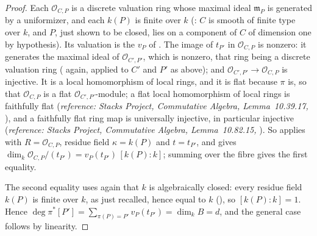 \begin{proof}
Each \(\mathcal O_{C,P}\) is a discrete valuation ring whose maximal
ideal \(\mathfrak m_P\) is generated by a uniformizer, and each
\(k(P)\) is finite over \(k\)
(: \(C\) is smooth of finite type
over \(k\), and \(P\), just shown to be closed, lies on a component of
\(C\) of dimension one by hypothesis).  Its valuation is the \(v_P\) of
.  The image of \(t_{P'}\) in
\(\mathcal O_{C,P}\) is nonzero: it generates the maximal ideal of
\(\mathcal O_{C',P'}\), which is nonzero, that ring being a discrete
valuation ring ( again, applied to
\(C'\) and \(P'\) as above); and
\(\mathcal O_{C',P'}\to\mathcal O_{C,P}\) is injective.  It is a local
homomorphism of local rings, and it is flat because \(\pi\) is, so that
\(\mathcal O_{C,P}\) is a flat \(\mathcal O_{C',P'}\)-module; a flat
local homomorphism of local rings is faithfully flat
(\emph{reference: Stacks Project, Commutative Algebra,
Lemma~10.39.17, }), and a faithfully flat ring map
is universally injective, in particular injective
(\emph{reference: Stacks Project, Commutative Algebra,
Lemma~10.82.15, }).
So  applies with
\(R=\mathcal O_{C,P}\), residue field \(\kappa=k(P)\) and
\(t=t_{P'}\), and gives
\(\dim_k\mathcal O_{C,P}/(t_{P'})=v_P(t_{P'})\,[k(P):k]\); summing over
the fibre gives the first equality.

The second equality uses again that \(k\) is algebraically closed:
every residue field \(k(P)\) is finite over \(k\), as just recalled,
hence equal to \(k\) (), so
\([k(P):k]=1\).  Hence
\(\deg\pi^*[P']=\sum_{\pi(P)=P'}v_P(t_{P'})=\dim_kB=d\), and the
general case follows by linearity.
\end{proof}

